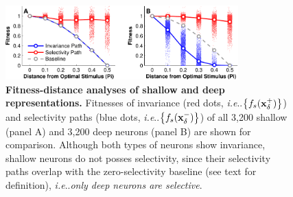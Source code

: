 \documentclass[fleqn]{article} %
\makeatletter
\DeclareRobustCommand\onedot{\futurelet\@let@token\@onedot}
\def\@onedot{\ifx\@let@token.\else.\null\fi\xspace}
\def\ie{\emph{i.e}\onedot} \def\Ie{\emph{I.e}\onedot}
\makeatother
\begin{document}
\begin{figure}[t]
\centering \includegraphics[width=0.80\textwidth]{Figs/fda.pdf} 
\caption{{\bf Fitness-distance analyses of shallow and deep representations.} %
Fitnesses of invariance (red dots, \ie $\left\lbrace f_s(\bf{x}^{+}_{\delta}) \right\rbrace$) and selectivity paths (blue dots, \ie $\left\lbrace f_s(\bf{x}^{-}_{\delta}) \right\rbrace$) of all 3,200 shallow (panel A) and 3,200 deep neurons (panel B) are shown for comparison\protect\footnotemark.
Although both types of neurons show invariance, shallow neurons do not posses selectivity, since their selectivity paths overlap with the zero-selectivity baseline (see text for definition), \ie \emph{only deep neurons are selective}.
}
\label{fig:fda}
\end{figure}


\newcommand{\defbaseline}{Given a single inner-product neuron $f_n({\bf{x}}) = {\bf{w}}^{T}{\bf{x}}$ and $\left\| \bf{x} \right\| = 1$, we have $\hat{\bf{x}} = \bf{w}$ and thus the invariance (and selectivity) curve $f_n({\bf{x}}_{\delta}) = \langle \hat{\bf{x}} ,{\bf{x}}_{\delta} \rangle = \cos(\delta)$ by definition.}
\end{document}

